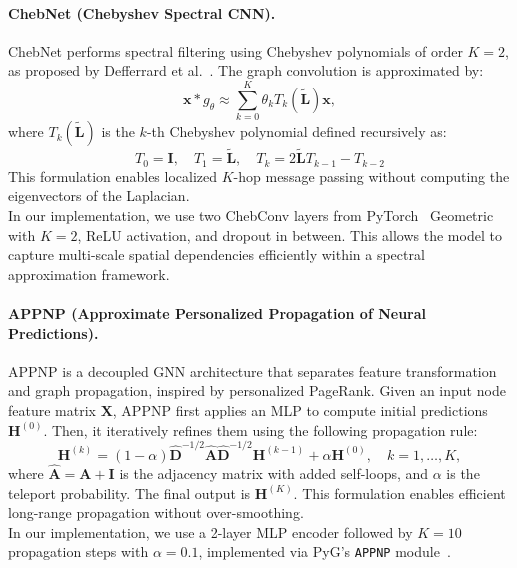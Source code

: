 \documentclass[runningheads]{llncs}
\begin{document}
\paragraph{ChebNet (Chebyshev Spectral CNN).}
ChebNet performs spectral filtering using Chebyshev polynomials of order $K=2$, as proposed by Defferrard et al.~\cite{defferrard2016convolutional}. The graph convolution is approximated by:
\[
\mathbf{x} \ast g_\theta \approx \sum_{k=0}^{K} \theta_k T_k(\tilde{\mathbf{L}}) \mathbf{x},
\]
where $T_k(\tilde{\mathbf{L}})$ is the $k$-th Chebyshev polynomial defined recursively as:
\[
T_0 = \mathbf{I}, \quad T_1 = \tilde{\mathbf{L}}, \quad T_k = 2 \tilde{\mathbf{L}} T_{k-1} - T_{k-2}
\]
This formulation enables localized $K$-hop message passing without computing the eigenvectors of the Laplacian.\\
In our implementation, we use two ChebConv layers from PyTorch~\cite{rozemberczki2021pytorch} Geometric with $K=2$, ReLU activation, and dropout in between. This allows the model to capture multi-scale spatial dependencies efficiently within a spectral approximation framework.

\paragraph{APPNP (Approximate Personalized Propagation of Neural Predictions).}
APPNP is a decoupled GNN architecture that separates feature transformation and graph propagation, inspired by personalized PageRank. Given an input node feature matrix $\mathbf{X}$, APPNP first applies an MLP to compute initial predictions $\mathbf{H}^{(0)}$. Then, it iteratively refines them using the following propagation rule:
\[
\mathbf{H}^{(k)} = (1 - \alpha) \hat{\mathbf{D}}^{-1/2} \hat{\mathbf{A}} \hat{\mathbf{D}}^{-1/2} \mathbf{H}^{(k-1)} + \alpha \mathbf{H}^{(0)}, \quad k = 1, \dots, K,
\]
where $\hat{\mathbf{A}} = \mathbf{A} + \mathbf{I}$ is the adjacency matrix with added self-loops, and $\alpha$ is the teleport probability. The final output is $\mathbf{H}^{(K)}$. This formulation enables efficient long-range propagation without over-smoothing.\\
In our implementation, we use a 2-layer MLP encoder followed by $K=10$ propagation steps with $\alpha=0.1$, implemented via PyG’s \texttt{APPNP} module~\cite{rozemberczki2021pytorch}.
\end{document}
